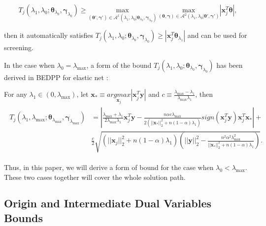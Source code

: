 \begin{equation}
    \label{eq:boundbound}
    T_j(\lambda_{1},\lambda_{0};\boldsymbol\theta_{\lambda_0},\boldsymbol\gamma_{\lambda_0})\geq \underset{(\boldsymbol\theta',\boldsymbol\gamma')\in\mathcal{A}^1(\lambda_1,\lambda_0|\boldsymbol\theta_{\lambda_0},\boldsymbol\gamma_{\lambda_0})}{\mathrm{max}}\,\underset{(\boldsymbol\theta,\boldsymbol\gamma)\in\mathcal{A}^2(\lambda_1,\lambda_0|\boldsymbol\theta',\boldsymbol\gamma')}{\mathrm{max}}|\boldsymbol x_j^T\boldsymbol\theta|,
\end{equation}

then it automatically satisfies $T_j(\lambda_{1},\lambda_{0};\boldsymbol\theta_{\lambda_0},\boldsymbol\gamma_{\lambda_0})\geq |\boldsymbol x_j^T\boldsymbol\theta_{\lambda_1}|$ and can be used for screening.

In the case when $\lambda_0=\lambda_{\max}$, a form of the bound $T_j(\lambda_{1},\lambda_{0};\boldsymbol\theta_{\lambda_0},\boldsymbol\gamma_{\lambda_0})$ has been derived in BEDPP for elastic net \citep{Zeng2021}:

\begin{theorem}
    \label{thm:0.1}
    For any $\lambda_1\in(0,\lambda_{\max})$, let $\boldsymbol x_*\equiv\underset{\boldsymbol x_j}{argmax}|\boldsymbol x_j^T\boldsymbol y|$ and $c\equiv \frac{\lambda_{\max}-\lambda_1}{\lambda_{\max}\lambda_1}$, then
    \begin{gather}
        \begin{aligned}
            T_j(\lambda_{1},\lambda_{\max};\boldsymbol\theta_{\lambda_{\max}},\boldsymbol\gamma_{\lambda_{\max}})&=\left|\frac{\lambda_{\max}+\lambda_1}{2\lambda_{\max}\lambda_1}\boldsymbol x_j^T\boldsymbol y-\frac{n\alpha c\lambda_{\max}}{2(||\boldsymbol x_*||_2^2+n(1-\alpha)\lambda_1)}\textit{sign}(\boldsymbol x_j^T\boldsymbol y) \boldsymbol x_j^T\boldsymbol x_*\right|+\\
            &\frac{c}{2}\sqrt{\left(||\boldsymbol x_j||_2^2+n(1-\alpha)\lambda_1\right)\left(||\boldsymbol y||_2^2-\frac{n^2\alpha^2\lambda_{\max}^2}{||\boldsymbol x_*||_2^2+n(1-\alpha)\lambda_1}\right)}.
        \end{aligned}
    \end{gather}
\end{theorem}

Thus, in this paper, we will derive a form of bound for the case when $\lambda_0<\lambda_{\max}$. These two cases together will cover the whole solution path.

\subsection{Origin and Intermediate Dual Variables Bounds}

